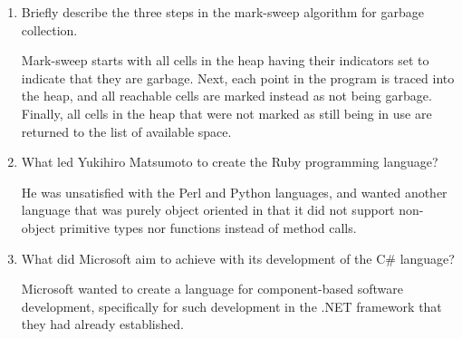 \begin{enumerate}
\begin{answer}
    \end{answer}

  \item Briefly describe the three steps in the mark-sweep algorithm
    for garbage collection.

  \begin{answer}

    Mark-sweep starts with all cells in the heap having their indicators set to indicate that they are garbage. Next, each point in the program is traced into the heap, and all reachable cells are marked instead as not being garbage. Finally, all cells in the heap that were not marked as still being in use are returned to the list of available space.

    \end{answer}

  \item What led Yukihiro Matsumoto to create the Ruby programming language?

  \begin{answer}

    He was unsatisfied with the Perl and Python languages, and wanted another language that was purely object oriented in that it did not support non-object primitive types nor functions instead of method calls.

    \end{answer}

  \item What did Microsoft aim to achieve with its development of the
    C\# language?

  \begin{answer}

    Microsoft wanted to create a language for component-based software development, specifically for such development in the .NET framework that they had already established.

    \end{answer}

  \end{enumerate}

























